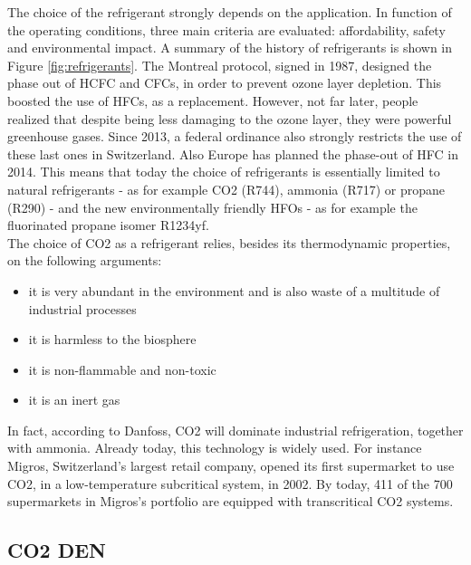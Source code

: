 \documentclass{article}
\begin{document}
The choice of the refrigerant strongly depends on the application. In function of the operating conditions, three main criteria are evaluated: affordability, safety and environmental impact.
A summary of the history of refrigerants is shown in Figure \ref{fig:refrigerants}.
The Montreal protocol, signed in 1987, designed the phase out of HCFC and CFCs, in order to prevent ozone layer depletion. This boosted the use of HFCs, as a replacement. However, not far later, people realized that despite being less damaging to the ozone layer, they were powerful greenhouse gases. Since 2013, a federal ordinance also strongly restricts the use of these last ones in Switzerland\cite{hydrocarbons21.comSwitzerlandIntroduceHFC}. Also Europe has planned the phase-out of HFC in 2014\cite{europeancommissionforclimateactionEULegislationControl2016}. This means that today the choice of refrigerants is essentially limited to natural refrigerants - as for example CO2 (R744), ammonia (R717) or propane (R290) - and the new environmentally friendly HFOs - as for example the fluorinated propane isomer R1234yf.\\

The choice of CO2 as a refrigerant relies, besides its thermodynamic properties, on the following arguments\cite{cavalliniPROPERTIESCO2REFRIGERANT}:
\begin{itemize}
	\item it is very abundant in the environment and is also waste of a multitude of industrial processes
	\item it is harmless to the biosphere
	\item it is non-flammable and non-toxic
	\item it is an inert gas
\end{itemize}

In fact, according to Danfoss\cite{danfossRefrigerantOptionsNow2017}, CO2 will dominate industrial refrigeration, together with ammonia. Already today, this technology is widely used. For instance Migros, Switzerland's largest retail company, opened its first supermarket to use CO2, in a low-temperature subcritical system, in 2002. By today, 411 of the 700 supermarkets in Migros’s portfolio are equipped with transcritical CO2 systems\cite{williamsMigrosDNA2018}.


\subsection{CO2 DEN}

\end{document}
